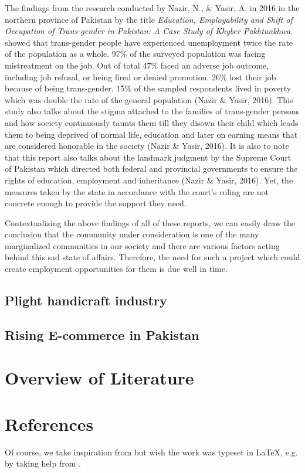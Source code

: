 The findings from the research conducted by Nazir, N., \& Yasir, A. in 2016 in the northern province of Pakistan by the title \textit {Education, Employability and Shift of Occupation of Trans-gender in Pakistan: A Case Study of Khyber Pakhtunkhwa.} showed that trans-gender people have experienced unemployment twice the rate of the population as a whole. 97\% of the surveyed population was facing mistreatment on the job. Out of total 47\% faced an adverse job outcome, including job refusal, or being fired or denied promotion. 26\% lost their job because of being trans-gender. 15\% of the sampled respondents lived in poverty which was double the rate of the general population (Nazir \& Yasir, 2016). This study also talks about the stigma attached to the families of trans-gender persons and how society continuously taunts them till they disown their child which leads them to being deprived of normal life, education and later on earning means that are considered honorable in the society (Nazir \& Yasir, 2016). It is also to note that this report also talks about the landmark judgment by the Supreme Court of Pakistan which directed both federal and provincial governments to ensure the rights of education, employment and inheritance (Nazir \& Yasir, 2016). Yet, the measures taken by the state in accordance with the court's ruling are not concrete enough to provide the support they need.

Contextualizing the above findings of all of these reports, we can easily draw the conclusion that the community under consideration is one of the many marginalized communities in our society and there are various factors acting behind this sad state of affairs. Therefore, the need for such a project which could create employment opportunities for them is due well in time.

\subsection{Plight handicraft industry}

\subsection{Rising E-commerce in Pakistan}


\section{Overview of Literature}

\section{References}




















Of course, we take inspiration from \cite{einstein} but wish the work was typeset in \LaTeX \cite{knuthwebsite}, e.g. by taking help from \cite{latexcompanion}.